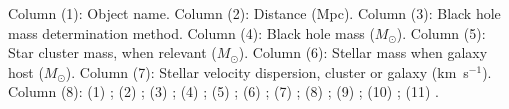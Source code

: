 \begin{table}
\begin{tabnote}
{Column (1): Object name. Column (2): Distance (Mpc). Column (3): Black hole mass determination method.
  Column (4): Black hole mass ($M_{\odot}$). Column (5): Star cluster mass, when relevant ($M_{\odot}$).
  Column (6): Stellar mass when galaxy host ($M_{\odot}$). Column (7): Stellar velocity dispersion, cluster or galaxy (km~s$^{-1}$).
  Column (8): (1) \citet{nguyenetal2019}; (2) \citet{denbroketal2015}; (3) \citet{petersonetal2005}; (4) \citet{wooetal2019}; (5) \citet{bentzetal2016};
  (6) \citet{weversetal2017}; (7) \citet{blagorodnovaetal2017}; (8) \citet{holoienetal2014} ; (9) \citet{arcavietal2014}; (10) \citet{gezarietal2012}; (11) \citet{maksymetal2013,maksymetal2014}. }
\end{tabnote}
\end{table}
